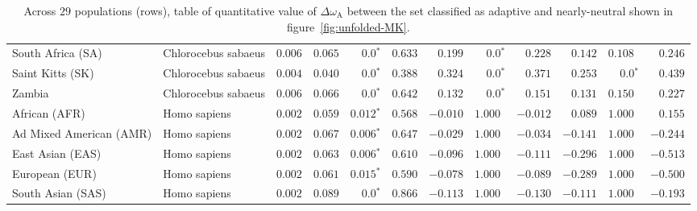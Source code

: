 \documentclass{article}
\begin{document}
\begin{table*}[!ht]
\begin{adjustbox}{width = 1\textwidth}
\begin{tabular}{||l|l|r||r|r|r||r|r|r||r|r|r||}
                \rowcolor{LIGHTGREY} South Africa (SA)              & Chlorocebus sabaeus & $ 0.006$ & $ 0.065$ & $\bm{0.0{^*}}$                  & $ 0.633$                                                                     & $ 0.199$ & $\bm{0.0{^*}}$ & $ 0.228$ & $ 0.142$ & $ 0.108~~$ & $ 0.246$ \\
                \rowcolor{LIGHTGREY} Saint Kitts (SK)               & Chlorocebus sabaeus & $ 0.004$ & $ 0.040$ & $\bm{0.0{^*}}$                  & $ 0.388$                                                                     & $ 0.324$ & $\bm{0.0{^*}}$ & $ 0.371$ & $ 0.253$ & $\bm{0.0{^*}}$ & $ 0.439$ \\
                \rowcolor{LIGHTGREY} Zambia                         & Chlorocebus sabaeus & $ 0.006$ & $ 0.066$ & $\bm{0.0{^*}}$                  & $ 0.642$                                                                     & $ 0.132$                      & $\bm{0.0{^*}}$ & $ 0.151$ & $ 0.131$ & $ 0.150~~$ & $ 0.227$ \\
                African (AFR)                                       & Homo sapiens        & $ 0.002$ & $ 0.059$ & $\bm{ 0.012{^*}}$ & $ 0.568$ & $-0.010$ & $ 1.000~~$ & $-0.012$ & $ 0.089$ & $ 1.000~~$ & $ 0.155$ \\
                Ad Mixed American (AMR)                             & Homo sapiens        & $ 0.002$ & $ 0.067$ & $\bm{ 0.006{^*}}$ & $ 0.647$ & $-0.029$ & $ 1.000~~$ & $-0.034$ & $-0.141$ & $ 1.000~~$ & $-0.244$ \\
                East Asian (EAS)                                    & Homo sapiens        & $ 0.002$ & $ 0.063$ & $\bm{ 0.006{^*}}$ & $ 0.610$ & $-0.096$ & $ 1.000~~$ & $-0.111$ & $-0.296$ & $ 1.000~~$ & $-0.513$ \\
                European (EUR)                                      & Homo sapiens        & $ 0.002$ & $ 0.061$ & $\bm{ 0.015{^*}}$ & $ 0.590$ & $-0.078$ & $ 1.000~~$ & $-0.089$ & $-0.289$ & $ 1.000~~$ & $-0.500$ \\
                South Asian (SAS)                                   & Homo sapiens        & $ 0.002$ & $ 0.089$ & $\bm{0.0{^*}}$    & $ 0.866$ & $-0.113$ & $ 1.000~~$ & $-0.130$ & $-0.111$ & $ 1.000~~$ & $-0.193$ \\
                \bottomrule
            \end{tabular}
        \end{adjustbox}
        \caption{
            Across $29$ populations (rows), table of quantitative value of $\Delta \omega_{\mathrm{A}}$ between the set classified as adaptive and nearly-neutral shown in figure~\ref{fig:unfolded-MK}.
}
\end{table*}
\end{document}

